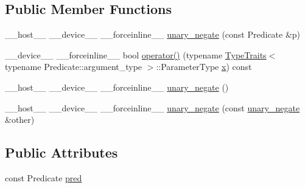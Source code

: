 \subsection*{Public Member Functions}
\begin{DoxyCompactItemize}
\item 
\-\_\-\-\_\-host\-\_\-\-\_\- \-\_\-\-\_\-device\-\_\-\-\_\- \-\_\-\-\_\-forceinline\-\_\-\-\_\- \hyperlink{structcv_1_1gpu_1_1device_1_1unary__negate_ad2799470cab2385515e53fd6245a2323}{unary\-\_\-negate} (const Predicate \&p)
\item 
\-\_\-\-\_\-device\-\_\-\-\_\- \-\_\-\-\_\-forceinline\-\_\-\-\_\- bool \hyperlink{structcv_1_1gpu_1_1device_1_1unary__negate_a80556dad478727e7ee6704be8b7bd96e}{operator()} (typename \hyperlink{structcv_1_1gpu_1_1device_1_1TypeTraits}{Type\-Traits}$<$ typename Predicate\-::argument\-\_\-type $>$\-::Parameter\-Type \hyperlink{highgui__c_8h_a6150e0515f7202e2fb518f7206ed97dc}{x}) const 
\item 
\-\_\-\-\_\-host\-\_\-\-\_\- \-\_\-\-\_\-device\-\_\-\-\_\- \-\_\-\-\_\-forceinline\-\_\-\-\_\- \hyperlink{structcv_1_1gpu_1_1device_1_1unary__negate_a4d4c9e1808badfbb2c01831c20ba603b}{unary\-\_\-negate} ()
\item 
\-\_\-\-\_\-host\-\_\-\-\_\- \-\_\-\-\_\-device\-\_\-\-\_\- \-\_\-\-\_\-forceinline\-\_\-\-\_\- \hyperlink{structcv_1_1gpu_1_1device_1_1unary__negate_a543b2a0f80b2f5e62968f66000780e4b}{unary\-\_\-negate} (const \hyperlink{structcv_1_1gpu_1_1device_1_1unary__negate}{unary\-\_\-negate} \&other)
\end{DoxyCompactItemize}
\subsection*{Public Attributes}
\begin{DoxyCompactItemize}
\item 
const Predicate \hyperlink{structcv_1_1gpu_1_1device_1_1unary__negate_a89c8a6a102d64d1654ff6faea0783bb9}{pred}
\end{DoxyCompactItemize}


